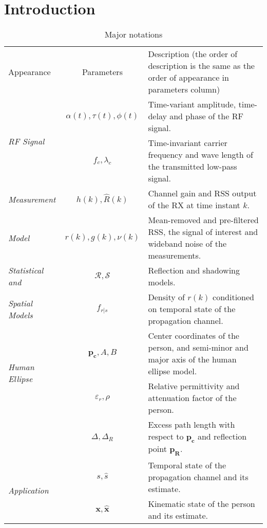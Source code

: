 \documentclass[journal, 10pt, twocolumn, balance]{IEEEtran}
\begin{document}
\section{Introduction} \label{S:introduction}
\begin{table*}\caption{Major notations} \centering \renewcommand{\arraystretch}{1.2}\begin{tabular}{| l | c | l |} 
	\hline\hline
        \multirow{2}{*}{Appearance} & \multirow{2}{*}{Parameters} & \multirow{2}{*}{Description (the order of description is the same as the order of appearance in parameters column)}  \\
	& & \\ \hline
	
	\multirow{2}{*}{\emph{RF Signal}}  & $\alpha(t), \tau(t), \phi(t)$& Time-variant amplitude, time-delay and phase of the RF signal. \\
	& $f_c, \lambda_c$ & Time-invariant carrier frequency and wave length of the transmitted low-pass signal. \\ \hline
	
	\emph{Measurement}  & $h(k), \hat{R}(k) $   & Channel gain and RSS output of the RX at time instant $k$. \\
	\emph{Model} & $ r(k), g(k), \nu(k)$ & Mean-removed and pre-filtered RSS, the signal of interest and wideband noise of the measurements.  \\ \hline
	
	\emph{Statistical and}  & $\mathcal{R}, \mathcal{S}$ & Reflection and shadowing models. \\ 
	\emph{Spatial Models} & $f_{r|s}$ & Density of $r(k)$ conditioned on temporal state of the propagation channel. \\ \hline
	
	\multirow{2}{*}{\emph{Human Ellipse}}  & $\bm{p_c}, A, B$ & Center coordinates of the person, and semi-minor and major axis of the human ellipse model.\\
	\multirow{2}{*}{\emph{Model}}  &  $\varepsilon_r, \rho$  & Relative permittivity and attenuation factor of the person. \\
	
	 & $\Delta, \Delta_R$ & Excess path length with respect to $\bm{p_c}$ and reflection point $\bm{p_R}$. \\ \hline
	
	
	\multirow{2}{*}{\emph{Application}}  & $s, \hat{s}$  &Temporal state of the propagation channel and its estimate.   \\ 
	& $\bm{x}, \bm{\hat{x}}$ &  Kinematic state of the person and its estimate. \\ \hline
	

\end{tabular}
\end{table*}
\end{document}
